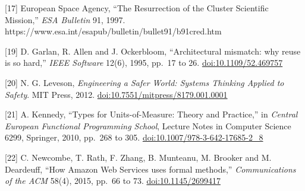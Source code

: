 \documentclass[
  10pt,
]{article}
\begin{document}
{[}17{]} European Space Agency, ``The Resurrection of the Cluster
Scientific Mission,'' \emph{ESA Bulletin} 91, 1997.
https://www.esa.int/esapub/bulletin/bullet91/b91cred.htm

{[}19{]} D. Garlan, R. Allen and J. Ockerbloom, ``Architectural
mismatch: why reuse is so hard,'' \emph{IEEE Software} 12(6), 1995,
pp.~17 to 26.
\href{https://doi.org/10.1109/52.469757}{doi:10.1109/52.469757}

{[}20{]} N. G. Leveson, \emph{Engineering a Safer World: Systems
Thinking Applied to Safety}. MIT Press, 2012.
\href{https://doi.org/10.7551/mitpress/8179.001.0001}{doi:10.7551/mitpress/8179.001.0001}

{[}21{]} A. Kennedy, ``Types for Units-of-Measure: Theory and
Practice,'' in \emph{Central European Functional Programming School},
Lecture Notes in Computer Science 6299, Springer, 2010, pp.~268 to 305.
\href{https://doi.org/10.1007/978-3-642-17685-2_8}{doi:10.1007/978-3-642-17685-2\_8}

{[}22{]} C. Newcombe, T. Rath, F. Zhang, B. Munteanu, M. Brooker and M.
Deardeuff, ``How Amazon Web Services uses formal methods,''
\emph{Communications of the ACM} 58(4), 2015, pp.~66 to 73.
\href{https://doi.org/10.1145/2699417}{doi:10.1145/2699417}
\end{document}

